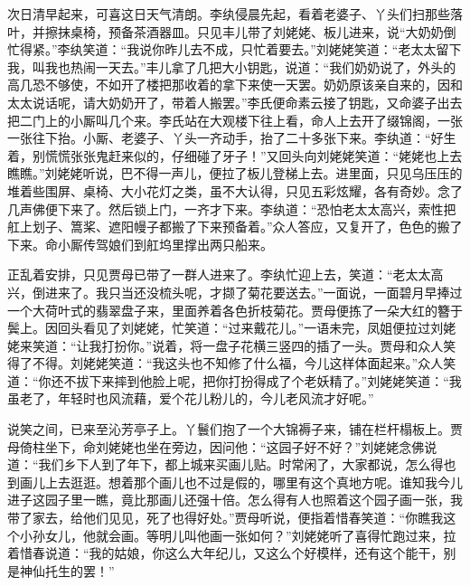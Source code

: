 \documentclass[12pt,oneside]{book}
\begin{document}
次日清早起来，可喜这日天气清朗。李纨侵晨先起，看着老婆子、丫头们扫那些落叶，并擦抹桌椅，预备茶酒器皿。只见丰儿带了刘姥姥、板儿进来，说“大奶奶倒忙得紧。”李纨笑道：“我说你昨儿去不成，只忙着要去。”刘姥姥笑道：“老太太留下我，叫我也热闹一天去。”丰儿拿了几把大小钥匙，说道：“我们奶奶说了，外头的高几恐不够使，不如开了楼把那收着的拿下来使一天罢。奶奶原该亲自来的，因和太太说话呢，请大奶奶开了，带着人搬罢。”李氏便命素云接了钥匙，又命婆子出去把二门上的小厮叫几个来。李氏站在大观楼下往上看，命人上去开了缀锦阁，一张一张往下抬。小厮、老婆子、丫头一齐动手，抬了二十多张下来。李纨道：“好生着，别慌慌张张鬼赶来似的，仔细碰了牙子！”又回头向刘姥姥笑道：“姥姥也上去瞧瞧。”刘姥姥听说，巴不得一声儿，便拉了板儿登梯上去。进里面，只见乌压压的堆着些围屏、桌椅、大小花灯之类，虽不大认得，只见五彩炫耀，各有奇妙。念了几声佛便下来了。然后锁上门，一齐才下来。李纨道：“恐怕老太太高兴，索性把舡上划子、篙桨、遮阳幔子都搬了下来预备着。”众人答应，又复开了，色色的搬了下来。命小厮传驾娘们到舡坞里撑出两只船来。

正乱着安排，只见贾母已带了一群人进来了。李纨忙迎上去，笑道：“老太太高兴，倒进来了。我只当还没梳头呢，才撷了菊花要送去。”一面说，一面碧月早捧过一个大荷叶式的翡翠盘子来，里面养着各色折枝菊花。贾母便拣了一朵大红的簪于鬓上。因回头看见了刘姥姥，忙笑道：“过来戴花儿。”一语未完，凤姐便拉过刘姥姥来笑道：“让我打扮你。”说着，将一盘子花横三竖四的插了一头。贾母和众人笑得了不得。刘姥姥笑道：“我这头也不知修了什么福，今儿这样体面起来。”众人笑道：“你还不拔下来摔到他脸上呢，把你打扮得成了个老妖精了。”刘姥姥笑道：“我虽老了，年轻时也风流藉，爱个花儿粉儿的，今儿老风流才好呢。”

说笑之间，已来至沁芳亭子上。丫鬟们抱了一个大锦褥子来，铺在栏杆榻板上。贾母倚柱坐下，命刘姥姥也坐在旁边，因问他：“这园子好不好？”刘姥姥念佛说道：“我们乡下人到了年下，都上城来买画儿贴。时常闲了，大家都说，怎么得也到画儿上去逛逛。想着那个画儿也不过是假的，哪里有这个真地方呢。谁知我今儿进子这园子里一瞧，竟比那画儿还强十倍。怎么得有人也照着这个园子画一张，我带了家去，给他们见见，死了也得好处。”贾母听说，便指着惜春笑道：“你瞧我这个小孙女儿，他就会画。等明儿叫他画一张如何？”刘姥姥听了喜得忙跑过来，拉着惜春说道：“我的姑娘，你这么大年纪儿，又这么个好模样，还有这个能干，别是神仙托生的罢！”
\end{document}
